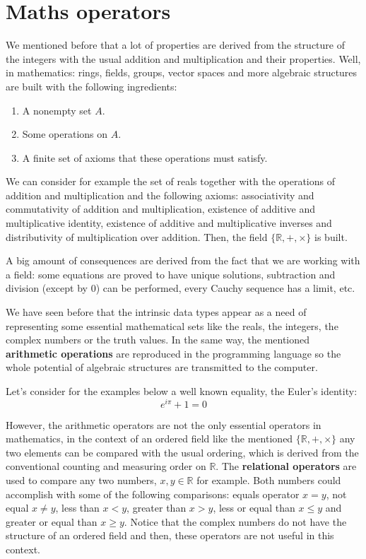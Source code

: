     \newpage
    \section{Maths operators}
We mentioned before that a lot of properties are derived from the structure of the integers with the usual addition and multiplication and their properties. 
Well, in mathematics: rings, fields, groups, vector spaces and more algebraic structures 
are built with the following ingredients:
\vspace{-0.6cm}
\begin{enumerate}[noitemsep]
    \item A nonempty set $A$.
    \item Some operations on $A$.
    \item A finite set of axioms that these operations must satisfy.   
\end{enumerate}
\vspace{-0.6cm}
We can consider for example the set of reals together 
with the operations of addition and multiplication 
and the following axioms: 
associativity and commutativity of addition and multiplication, 
existence of additive and multiplicative identity,
existence of additive and multiplicative inverses and
distributivity of multiplication over addition.
Then, the field $\{\mathbb{R}, +, \times\}$ is built. 

A big amount of consequences are derived from the fact that we are working with a field:
some equations are proved to have unique solutions, subtraction and division (except by 0)
can be performed, every Cauchy sequence has a limit, etc. 

We have seen before that the intrinsic data types appear as a need of representing 
some essential mathematical sets like the reals, the integers, the complex numbers or
the truth values. 
In the same way, the mentioned \textbf{arithmetic operations} are reproduced in the programming language 
so the whole potential of algebraic structures are transmitted to the computer. 

Let's consider for the examples below a well known equality, the Euler's identity:
$$
e^{i\pi}+1 = 0
$$

However, the arithmetic operators are not the only essential operators in mathematics, 
in the context of an ordered field like the mentioned $\{\mathbb{R}, +, \times\}$
any two elements can be compared with the usual ordering, which is derived from the 
conventional counting and measuring order on $\mathbb{R}$. 
The \textbf{relational operators} are used to compare any two numbers, $x, y \in \mathbb{R}$ for example. 
Both numbers could accomplish with some of the following comparisons: 
equals operator $x = y$, not equal $x\neq y$, less than $x < y$, greater than $x > y$, less or equal than $x \leq y$ and greater or equal than $x\geq y$. 
Notice that the complex numbers do not have the structure of an ordered field and then, these operators are not useful in this context. 

